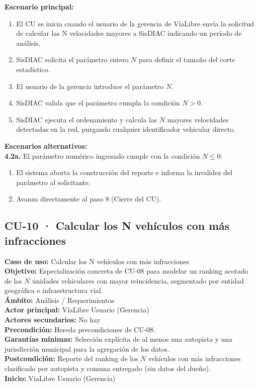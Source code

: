 \documentclass[12pt,letterpaper]{article}
\begin{document}
\noindent \textbf{Escenario principal:}
\begin{enumerate}[nosep, leftmargin=*]
	\item[1.]  El CU se inicia cuando el usuario de la gerencia de VíaLibre envía la solicitud de calcular las N velocidades mayores a SisDIAC indicando un período de análisis.
	\item[4.] SisDIAC solicita el parámetro entero $N$ para definir el tamaño del corte estadístico.
	\item[4.1.] El usuario de la gerencia introduce el parámetro $N$.
	\item[4.2.] SisDIAC valida que el parámetro cumpla la condición $N > 0$.
	\item[5.] SisDIAC ejecuta el ordenamiento y calcula las $N$ mayores velocidades detectadas en la red, purgando cualquier identificador vehicular directo.
\end{enumerate}

\noindent \textbf{Escenarios alternativos:} \\
\textbf{4.2a.} El parámetro numérico ingresado cumple con la condición $N \leq 0$:
\begin{enumerate}[nosep]
	\item[4.2a1.] El sistema aborta la construcción del reporte e informa la invalidez del parámetro al solicitante.
	\item[4.2a2.] Avanza directamente al paso 8 (Cierre del CU).
\end{enumerate}


\newpage
\subsection{CU-10 · Calcular los N vehículos con más infracciones}

\noindent \textbf{Caso de uso:} Calcular los N vehículos con más infracciones \\
\textbf{Objetivo:} Especialización concreta de CU-08 para modelar un ranking acotado de las $N$ unidades vehiculares con mayor reincidencia, segmentado por entidad geográfica e infraestructura vial. \\
\textbf{Ámbito:} Análisis / Requerimientos \\
\textbf{Actor principal:} VíaLibre Usuario (Gerencia) \\
\textbf{Actores secundarios:} No hay \\
\textbf{Precondición:} Hereda precondiciones de CU-08. \\
\textbf{Garantías mínimas:} Selección explícita de al menos una autopista y una jurisdicción municipal para la agregación de los datos. \\
\textbf{Postcondición:} Reporte del ranking de los $N$ vehículos con más infracciones clasificado por autopista y comuna entregado (sin datos del dueño). \\
\textbf{Inicio:} VíaLibre Usuario (Gerencia) \\
\end{document}
